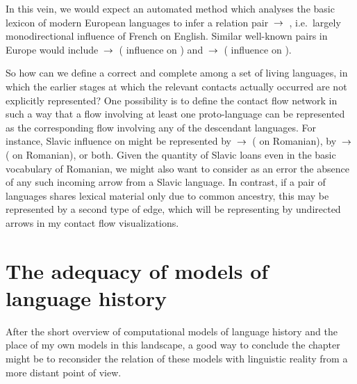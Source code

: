 In this vein, we would expect an automated method which analyses the basic lexicon of modern European languages to infer a relation pair  $\kern 2pt\hbox{$\rightarrow$}\kern 2pt$ , i.e.\ largely monodirectional influence of French on English. Similar well-known pairs in Europe would include  $\kern 2pt\hbox{$\rightarrow$}\kern 2pt$  ( influence on ) and  $\kern 2pt\hbox{$\rightarrow$}\kern 2pt$  ( influence on ).

So how can we define a correct and complete  among a set of living languages, in which the earlier stages at which the relevant contacts actually occurred are not explicitly represented? One possibility is to define the contact flow network in such a way that a flow involving at least one proto-language can be represented as the corresponding flow involving any of the descendant languages. For instance, Slavic influence on  might be represented by  $\kern 2pt\hbox{$\rightarrow$}\kern 2pt$  ( on Romanian), by  $\kern 2pt\hbox{$\rightarrow$}\kern 2pt$  ( on Romanian), or both. Given the quantity of Slavic loans even in the basic vocabulary of Romanian, we might also want to consider as an error the absence of any such incoming arrow from a Slavic language. In contrast, if a pair of languages shares lexical material only due to common ancestry, this may be represented by a second type of edge, which will be representing by undirected arrows in my contact flow visualizations.

\largerpage
\section{The adequacy of models of language history}\label{sec:2:7}
After the short overview of computational models of language history and the place of my own models in this landscape, a good way to conclude the chapter might be to reconsider the relation of these models with linguistic reality from a more distant point of view. 

